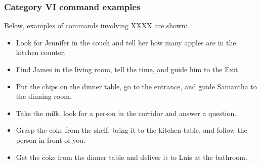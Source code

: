 \subsubsection{Category VI command examples}
Below, examples of commands involving XXXX are shown:
\begin{itemize}
	\item Look for Jennifer in the couch and tell her how many apples are in the kitchen counter.
	\item Find James in the living room, tell the time, and guide him to the Exit.
	\item Put the chips on the dinner table, go to the entrance, and guide Samantha to the dinning room.
	\item Take the milk, look for a person in the corridor and answer a question.
	\item Grasp the coke from the shelf, bring it to the kitchen table, and follow the person in front of you.
	\item Get the coke from the dinner table and deliver it to Luis at the bathroom.
\end{itemize}


























